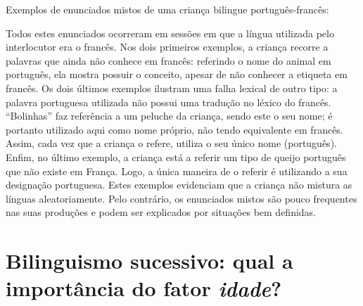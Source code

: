 \documentclass[output=paper]{LSP/langsci}
\begin{document}
\ea\label{ex:almeida_1}
Exemplos de enunciados mistos de uma criança bilingue português-francês:
\z
\z

Todos estes enunciados ocorreram em sessões em que a língua utilizada pelo interlocutor era o francês. Nos dois primeiros exemplos, a criança recorre a palavras que ainda não conhece em francês: referindo o nome do animal em português, ela mostra possuir o conceito, apesar de não conhecer a etiqueta em francês. Os dois últimos exemplos ilustram uma falha lexical de outro tipo: a palavra portuguesa utilizada não possui uma tradução no léxico do francês. ``Bolinhas'' faz referência a um peluche da criança, sendo este o seu nome; é portanto utilizado aqui como nome próprio, não tendo equivalente em francês. Assim, cada vez que a criança o refere, utiliza o seu único nome (português). Enfim, no último exemplo, a criança está a referir um tipo de queijo português que não existe em França. Logo, a única maneira de o referir é utilizando a sua designação portuguesa. Estes exemplos evidenciam que a criança não mistura as línguas aleatoriamente. Pelo contrário, os enunciados mistos são pouco frequentes nas suas produções e podem ser explicados por situações bem definidas. 

\section{Bilinguismo sucessivo: qual a importância do fator \textit{idade}?}%
\label{sec:almeida_bilinguismo_sucess}
\end{document}
